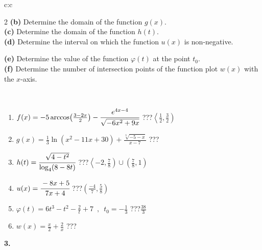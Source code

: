 \documentclass[10pt]{report}
\begin{document}
\begin{tabular}{c:c}
\begin{minipage}[c][104.5mm][t]{0.5\linewidth}
\begin{center}
\begin{minipage}{0.95\linewidth}
\begin{center}
{\begin{multicols}{2}
\textbf{(b)} Determine the domain of the function \(g(x)\). \\[1mm]
\textbf{(c)} Determine the domain of the function \(h(t)\). \\[1mm]
\textbf{(d)} Determine the interval on which the function \(u(x)\) is non-negative. \par \columnbreak
\textbf{(e)} Determine the value of the function \(\varphi(t)\) at the point \(t_0\). \\[1mm]
\textbf{(f)} Determine the number of intersection points of the function plot \(w(x)\) with the \(x\)-axis. \\[1mm]
\end{multicols}
}
\end{center}
\end{minipage}
\\[4mm]
\begin{minipage}{0.79\linewidth}
\begin{center}
\begin{varwidth}{\linewidth}
\begin{enumerate}
\small
\item $f(x) = -5\arccos\!\left( \frac{3-2x}{2} \right) - \cfrac{e^{4x-4}}{\sqrt{-6x^2+9x}}$\quad \dotfill\; ???\;\dotfill \quad $\left\langle\frac{1}{2} , \frac{3}{2}\right)$
\item $g(x) = \frac{1}{3} \ln{\!(x^2-11x+30)}+\frac{\sqrt[3]{-5-x}}{x-7}$\quad \dotfill\; ???\;\dotfill {}
\item $h(t) = \cfrac{\sqrt{4-t^2}}{\log_4(8-8t)}$\quad \dotfill\; ???\;\dotfill \quad $\left\langle-2 , \frac{7}{8}\right)\cup\left(\frac{7}{8} , 1\right)$
\item $u(x) = \cfrac{-8x+5}{7x+4}$\quad \dotfill\; ???\;\dotfill \quad $\left(\frac{-4}{7} , \frac{5}{8}\right)$
\item $\varphi(t) = 6t^3-t^2-\frac{2}{t}+7 \enspace , \enspace t_0=-\frac{1}{3}$\quad \dotfill\; ???\;\dotfill \quad $\frac{38}{3}$
\item $w(x) = \frac{x}{2}+\frac{2}{x}$\quad \dotfill\; ???\;\dotfill {}
\end{enumerate}
\end{varwidth}
\end{center}
\end{minipage}
\begin{minipage}{0.20\linewidth}
\begin{center}
{\Huge\bfseries 3.} \\[2mm]

\end{center}
\end{minipage}
\end{center}
\end{minipage}
\end{tabular}
\end{document}
